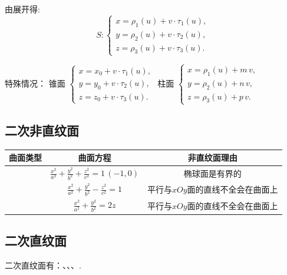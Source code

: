 \theorem[直纹面的参数方程]
由\link[直纹面的向量式方程]展开得:
\begin{equation}
S:
\begin{cases}
x=\rho_1(u)+v\cdot \tau_1(u),\\
y=\rho_2(u)+v\cdot \tau_2(u),\\
z=\rho_3(u)+v\cdot \tau_3(u).
\end{cases}
\end{equation}
\par {\color{dy}特殊情况}：
锥面
$\begin{cases}
x=x_0+v\cdot \tau_1(u),\\
y=y_0+v\cdot \tau_2(u),\\
z=z_0+v\cdot \tau_3(u).
\end{cases}$
\kg \kg 柱面
$
\begin{cases}
x=\rho_1(u)+m\,v,\\
y=\rho_2(u)+n\,v,\\
z=\rho_3(u)+p\,v.
\end{cases}
$

\subsection{二次非直纹面}
\sj
\begin{table}[h]
		\renewcommand\arraystretch{1.5}
	\begin{center}
		\begin{tabular}{|c|c|c|}
			\hline
			曲面类型 & 曲面方程 & 非直纹面理由\\
			\hline
			\link[椭球面] &$\displaystyle \frac{x^2}{a^2}+\frac{y^2}{b^2}+\frac{z^2}{c^2}=1\,(-1,0)$ & 椭球面是有界的  \\
			\hline 
			\link[双叶双曲面] & $ \displaystyle  \frac{x^2}{a^2}+\frac{y^2}{b^2}-\frac{z^2}{c^2}=1$ & 平行与$xOy$面的直线不全会在曲面上\\
			\hline
			\link[椭圆抛物面] & $\displaystyle  \frac{x^2}{a^2}+\frac{y^2}{b^2}=2z$  &平行与$xOy$面的直线不全会在曲面上\\
			\hline
		\end{tabular}
	\end{center}
	\renewcommand\arraystretch{1}
\end{table}

\subsection{二次直纹面}
\par 二次直纹面有：\link[二次锥面]、\link[二次柱面]、\link[单叶双曲面]、\link[双曲抛物面].

